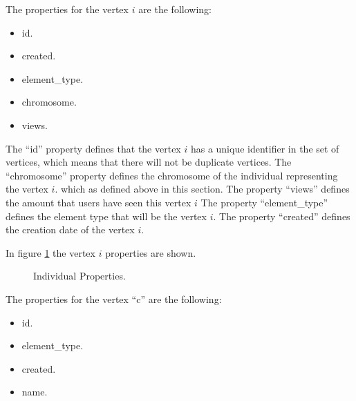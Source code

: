The properties for the vertex $i$ are the following:
\begin{itemize} 
\item id. 
\item created. 
\item element\_type.
\item chromosome.
\item views.
\end{itemize}

The “id” property defines that the vertex $i$ has a unique identifier in the set
of vertices, which means that there will not be duplicate vertices. The
“chromosome” property defines the chromosome of the individual representing the
vertex $i$. which as defined above in this section. The  property “views” defines
the amount that users have seen this vertex $i$ The property “element\_type”
defines the element type that will be the vertex $i$. The property “created”
defines the creation date of the vertex $i$. %


In figure \ref{fig:Individual_node} the vertex $i$ properties are shown.

\begin{figure}
\captionsetup{justification=centering,margin=2cm}
\centering
\setlength\fboxsep{0pt}
\setlength\fboxrule{0.7pt}
\caption{Individual Properties.}
\label{fig:Individual_node}       
\end{figure}

The properties for the vertex “c” are the following:

\begin{itemize} 
\item id. 
\item element\_type.
\item created. 
\item name.
\end{itemize}

